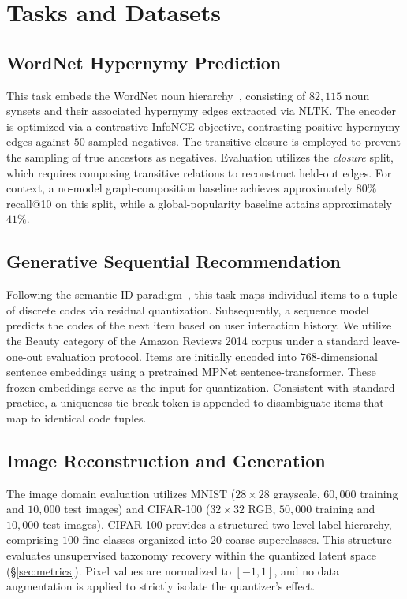 \documentclass[12pt]{report}
\begin{document}
\section{Tasks and Datasets}
\label{sec:tasks}

\subsection{WordNet Hypernymy Prediction}
\label{sec:tasks_nlp}
This task embeds the WordNet noun hierarchy~\cite{nickel2017poincare}, consisting of $82{,}115$ noun synsets and their associated hypernymy edges extracted via NLTK. The encoder is optimized via a contrastive InfoNCE objective, contrasting positive hypernymy edges against $50$ sampled negatives. The transitive closure is employed to prevent the sampling of true ancestors as negatives. Evaluation utilizes the \emph{closure} split, which requires composing transitive relations to reconstruct held-out edges. For context, a no-model graph-composition baseline achieves approximately $80\%$ recall@10 on this split, while a global-popularity baseline attains approximately $41\%$.

\subsection{Generative Sequential Recommendation}
\label{sec:tasks_rec}
Following the semantic-ID paradigm~\cite{tiger}, this task maps individual items to a tuple of discrete codes via residual quantization. Subsequently, a sequence model predicts the codes of the next item based on user interaction history. We utilize the Beauty category of the Amazon Reviews 2014 corpus under a standard leave-one-out evaluation protocol. Items are initially encoded into $768$-dimensional sentence embeddings using a pretrained MPNet sentence-transformer. These frozen embeddings serve as the input for quantization. Consistent with standard practice, a uniqueness tie-break token is appended to disambiguate items that map to identical code tuples.

\subsection{Image Reconstruction and Generation}
\label{sec:tasks_image}
The image domain evaluation utilizes MNIST ($28\times28$ grayscale, $60{,}000$ training and $10{,}000$ test images) and CIFAR-100 ($32\times32$ RGB, $50{,}000$ training and $10{,}000$ test images). CIFAR-100 provides a structured two-level label hierarchy, comprising $100$ fine classes organized into $20$ coarse superclasses. This structure evaluates unsupervised taxonomy recovery within the quantized latent space (\S\ref{sec:metrics}). Pixel values are normalized to $[-1,1]$, and no data augmentation is applied to strictly isolate the quantizer's effect.
\end{document}
